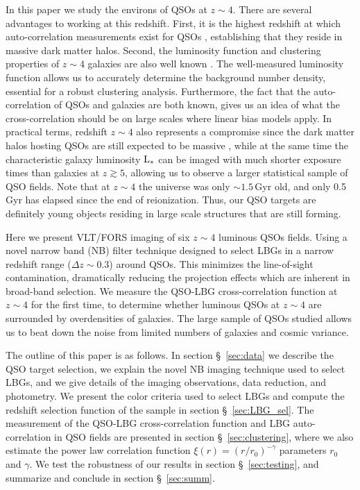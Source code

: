\documentclass[iop, revtex4]{emulateapj}
\begin{document}
In this paper we study the environs of QSOs at
$z\sim4$. There are several advantages to working at this
redshift. First, it is the highest redshift at which auto-correlation
measurements exist for QSOs \citep{Shen07}, establishing that
they reside in massive dark matter halos. Second, the
luminosity function and clustering properties of
$z\sim4$ galaxies are also well known \citep[e.g.][]{Shen07, Ouchi04a,
  Ouchi08}. The well-measured luminosity function
allows us to accurately determine the background 
number density, essential for a robust clustering analysis. Furthermore,
the fact that the auto-correlation of QSOs and galaxies are both known,
gives us an idea of what the cross-correlation should be on large scales
where linear bias models apply. In practical terms, redshift $z\sim 4$ also
represents a compromise since the dark matter halos hosting QSOs are still expected
to be massive \citep{Shen07}, while at the same time 
the characteristic galaxy luminosity $\rm L_{*}$ can be imaged with
much shorter exposure times than galaxies at $z\gtrsim5$, allowing us
to observe a larger statistical sample of QSO fields.  Note that at
$z\sim4$ the universe was only $\sim1.5$\,Gyr old, and only 0.5\,Gyr
has elapsed since the end of reionization. Thus, our QSO targets are
definitely  young objects residing in large scale structures that are
still forming.

Here we present VLT/FORS imaging of six $z\sim4$ luminous QSOs
fields. Using a novel narrow band (NB) filter technique designed to select
LBGs
in a narrow redshift range ($\Delta
z\sim0.3$) around QSOs. This minimizes the line-of-sight
contamination, dramatically reducing the projection effects which are
inherent in broad-band selection.
We measure the QSO-LBG cross-correlation function at $z\sim4$ for the
first time,
to determine whether luminous QSOs at $z\sim4$ are surrounded by
overdensities of galaxies. The large sample of QSOs studied allows
us to beat down the noise from limited numbers of galaxies and cosmic
variance. 

The outline of this paper is as follows. In section \S~\ref{sec:data}
we describe the QSO target selection, we explain the novel NB
imaging technique used to select LBGs, and we give details of the
imaging observations, data reduction, and photometry. We present the
color criteria used to select LBGs and compute the redshift selection
function of the sample in section \S~\ref{sec:LBG_sel}. The
measurement of the QSO-LBG cross-correlation function and LBG
auto-correlation in QSO fields are presented in section
\S~\ref{sec:clustering}, where we also estimate the power law
correlation function $\xi(r) = (r\slash r_0)^{-\gamma}$ parameters
$r_{0}$ and $\gamma$. We test the robustness of our results in section
\S~\ref{sec:testing}, and summarize and conclude in
section
\S~\ref{sec:summ}.
\end{document}

